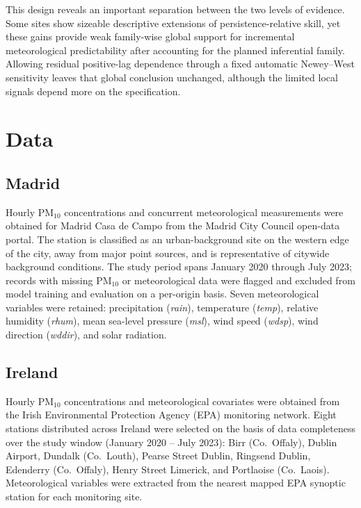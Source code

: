 \documentclass[pdflatex,sn-basic,iicol]{sn-jnl}
\newcommand{\PMten}{\ensuremath{\mathrm{PM}_{10}}}
\begin{document}
This design reveals an important separation between the two levels of
evidence. Some sites show sizeable descriptive extensions of
persistence-relative skill, yet these gains provide weak family-wise global
support for incremental meteorological predictability after accounting for
the planned inferential family. Allowing residual positive-lag dependence
through a fixed automatic Newey--West sensitivity leaves that global
conclusion unchanged, although the limited local signals depend more on the
specification.

\section{Data}
\label{sec:data}

\subsection{Madrid}

Hourly \PMten{} concentrations and concurrent meteorological measurements were
obtained for Madrid Casa de Campo from the Madrid City Council open-data portal.
The station is classified as an urban-background site on the western edge of
the city, away from major point sources, and is representative of citywide
background conditions.  The study period spans January 2020 through July 2023;
records with missing \PMten{} or meteorological data were flagged and excluded
from model training and evaluation on a per-origin basis.  Seven meteorological
variables were retained: precipitation (\textit{rain}), temperature
(\textit{temp}), relative humidity (\textit{rhum}), mean sea-level pressure
(\textit{msl}), wind speed (\textit{wdsp}), wind direction (\textit{wddir}),
and solar radiation.

\subsection{Ireland}

Hourly \PMten{} concentrations and meteorological covariates were obtained from
the Irish Environmental Protection Agency (EPA) monitoring network.  Eight
stations distributed across Ireland were selected on the basis of data
completeness over the study window (January 2020 -- July 2023):
Birr (Co.\ Offaly), Dublin Airport, Dundalk (Co.\ Louth), Pearse Street
Dublin, Ringsend Dublin, Edenderry (Co.\ Offaly), Henry Street Limerick, and
Portlaoise (Co.\ Laois).  Meteorological variables were extracted from the nearest
mapped EPA synoptic station for each monitoring site.
\end{document}
